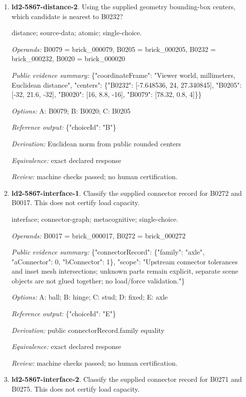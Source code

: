 \begin{enumerate}
\item \textbf{ld2-5867-distance-2}. Using the supplied geometry bounding-box centers, which candidate is nearest to B0232?
\par{\small distance; source-data; atomic; single-choice.\par\textit{Operands:} B0079 = brick\_000079, B0205 = brick\_000205, B0232 = brick\_000232, B0020 = brick\_000020\par\textit{Public evidence summary:} \{"coordinateFrame": "Viewer world, millimeters, Euclidean distance", "centers": \{"B0232": [-7.648536, 24, 27.340845], "B0205": [-32, 21.6, -32], "B0020": [16, 8.8, -16], "B0079": [78.32, 0.8, 4]\}\}\par\textit{Options:} A: B0079; B: B0020; C: B0205\par\textit{Reference output:} \{"choiceId": "B"\}\par\textit{Derivation:} Euclidean norm from public rounded centers\par\textit{Equivalence:} exact declared response\par\textit{Review:} machine checks passed; no human certification.}
\item \textbf{ld2-5867-interface-1}. Classify the supplied connector record for B0272 and B0017. This does not certify load capacity.
\par{\small interface; connector-graph; metacognitive; single-choice.\par\textit{Operands:} B0017 = brick\_000017, B0272 = brick\_000272\par\textit{Public evidence summary:} \{"connectorRecord": \{"family": "axle", "aConnector": 0, "bConnector": 1\}, "scope": "Upstream connector tolerances and inset mesh intersections; unknown parts remain explicit, separate scene objects are not glued together; no load/force validation."\}\par\textit{Options:} A: ball; B: hinge; C: stud; D: fixed; E: axle\par\textit{Reference output:} \{"choiceId": "E"\}\par\textit{Derivation:} public connectorRecord.family equality\par\textit{Equivalence:} exact declared response\par\textit{Review:} machine checks passed; no human certification.}
\item \textbf{ld2-5867-interface-2}. Classify the supplied connector record for B0271 and B0275. This does not certify load capacity.

\end{enumerate}
